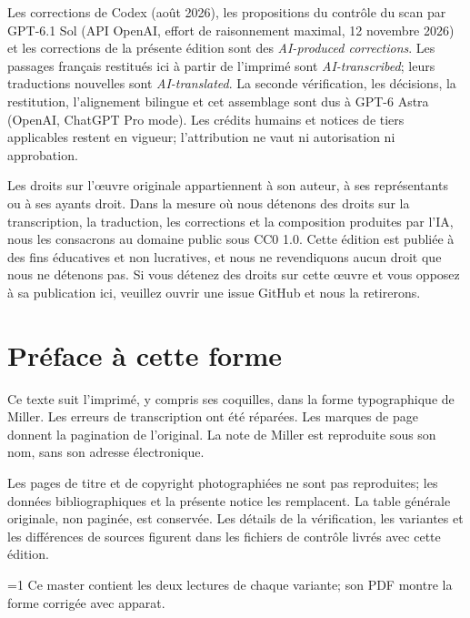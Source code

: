 \documentclass[oneside]{book}
\theoremstyle{sga-source}
\theoremstyle{sga-source-dash}
\theoremstyle{sga-source-dotdash}
\theoremstyle{sga-source-number-note-dash}
\theoremstyle{sga-source-note-number-dotdash}
\theoremstyle{sga-source-example-dotdash}
\theoremstyle{sga-source-inline-number}
\theoremstyle{sga-source-bare-number}
\theoremstyle{sga-source}
\providecommand\EditionIsMaster{1}
\begin{document}
\medskip
Les corrections de Codex (août 2026), les propositions du contrôle du scan
par GPT-6.1 Sol (API OpenAI, effort de raisonnement maximal, 12 novembre
2026) et les corrections de la présente édition sont des
\emph{AI-produced corrections}. Les passages français restitués ici à
partir de l’imprimé sont \emph{AI-transcribed}; leurs traductions nouvelles
sont \emph{AI-translated}. La seconde vérification, les décisions, la
restitution, l’alignement bilingue et cet assemblage sont dus à GPT-6 Astra
(OpenAI, ChatGPT Pro mode). Les crédits humains et notices de tiers
applicables restent en vigueur; l’attribution ne vaut ni autorisation ni
approbation.

\medskip
Les droits sur l'œuvre originale appartiennent à son auteur, à ses représentants ou à ses ayants
droit. Dans la mesure où nous détenons des droits sur la transcription, la traduction, les corrections et la
composition produites par l'IA, nous les consacrons au domaine public sous CC0 1.0. Cette édition est publiée
à des fins éducatives et non lucratives, et nous ne revendiquons aucun droit que nous ne détenons pas. Si vous
détenez des droits sur cette œuvre et vous opposez à sa publication ici, veuillez ouvrir une issue GitHub et
nous la retirerons.

\chapter*{Préface à cette forme}
Ce texte suit l’imprimé, y compris ses coquilles, dans la forme
typographique de Miller. Les erreurs de transcription ont été réparées.
Les marques de page donnent la pagination de l’original. La note de Miller
est reproduite sous son nom, sans son adresse électronique.

Les pages de titre et de copyright photographiées ne sont pas reproduites;
les données bibliographiques et la présente notice les remplacent. La
table générale originale, non paginée, est conservée. Les détails de la
vérification, les variantes et les différences de sources figurent dans
les fichiers de contrôle livrés avec cette édition.

\ifnum\EditionIsMaster=1\relax
Ce master contient les deux lectures de chaque variante; son PDF montre la forme corrigée avec apparat.
\fi

\clearpage

\or
\end{document}
